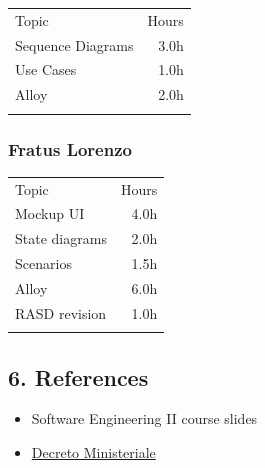 \documentclass[
]{article}
\providecommand{\tightlist}{%
  \setlength{\itemsep}{0pt}\setlength{\parskip}{0pt}}
\begin{document}
\begin{longtable}[]{@{}lr@{}}
\toprule
Topic & Hours \\ \addlinespace
\midrule
\endhead
Sequence Diagrams & 3.0h \\ \addlinespace
Use Cases & 1.0h \\ \addlinespace
Alloy & 2.0h \\ \addlinespace
\bottomrule
\end{longtable}

\hypertarget{fratus-lorenzo}{%
\subsubsection{Fratus Lorenzo}\label{fratus-lorenzo}}

\begin{longtable}[]{@{}lr@{}}
\toprule
Topic & Hours \\ \addlinespace
\midrule
\endhead
Mockup UI & 4.0h \\ \addlinespace
State diagrams & 2.0h \\ \addlinespace
Scenarios & 1.5h \\ \addlinespace
Alloy & 6.0h \\ \addlinespace
RASD revision & 1.0h \\ \addlinespace
\bottomrule
\end{longtable}

\hypertarget{references}{%
\subsection{6. References}\label{references}}

\begin{itemize}
\tightlist
\item
  Software Engineering II course slides
\item
  \href{https://www.gazzettaufficiale.it/atto/vediPermalink?atto.dataPubblicazioneGazzetta=2020-11-09\&atto.codiceRedazionale=20G00170\&tipoSerie=serie_generale\&tipoVigenza=originario\&tipoProvvedimento=*}{Decreto
  Ministeriale}
\end{itemize}
\end{document}

